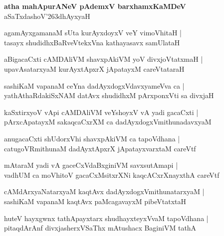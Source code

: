 \begin{center}
\textbf{\large atha mahApurANeV pAdemxV barxhamxKaMDeV}\\
aSaTxdashoV\char'263dhAyxyaH
\end{center}

\setcounter{shloka}{0}
\begin{shloka}
agamAyxgamanaM sUta kurAyxdoyxV veY vimoVhitaH |\\
tasayx shudidhxBaRveVtekxVna kathayasavx samUlataH 
\end{shloka}

\begin{shloka}
aBigacaCxti cAMDAliVM shavxpAkiVM yoV divxjoVtatxmaH |\\
upavAsatarxyaM kurAyxtApxrX jApatayxM careVtataraH
\end{shloka}

\begin{shloka}
sashiKaM vapanaM ceYna dadAyxdogxVdavxyameVva ca |\\
yathAthaRdakiSxNAM datAvx shudidhxM pArxponxVti sa divxjaH 
\end{shloka}

\begin{shloka}
kaSxtirxyoV vApi cAMDAliVM veYshoyxV vA yadi gacaCxti |\\
pArxcApatayxM sakaqcaCxrXM ca dadAyxdogxVmithunadavxyaM 
\end{shloka}

\begin{shloka}
anugacaCxti shUdorxVhi shavxpAkiVM ca tapoVdhana |\\
catugoVRmithunaM dadAyxtApxrX jApatayxvarxtaM careVtf
\end{shloka}

\begin{shloka}
mAtaraM yadi vA gaceCxVdaBxginiVM savxsutAmapi |\\
vadhUM ca moVhitoV gacaCxMsitxrXNi kaqcACxrXnayxthA careVtf
\end{shloka}

\begin{shloka}
cAMdArxyaNatarxyaM kaqtAvx dadAyxdogxVmithunatarxyaM |\\
sashiKaM vapanaM kaqtAvx paMcagavayxM pibeVtatxtaH
\end{shloka}

\begin{shloka}
huteV hayxgwnx tathApayxtarx shudhayxteyxVvaM tapoVdhana |\\
pitaqdArAnf divxjasherxVSaThx mAtushacx BaginiVM tathA
\end{shloka}

